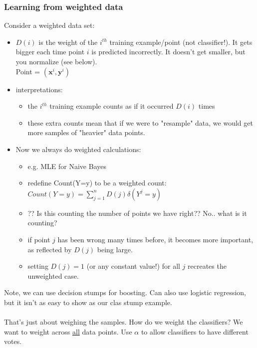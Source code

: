 \subsubsection{Learning from weighted data}  
Consider a weighted data set: \hfill \\
\begin{itemize}
	\item $D(i)$ is the weight of the $i^{th}$ training example/point (not classifier!). 
		It gets bigger each time point $i$ is predicted incorrectly.  
		It doesn't get smaller, but you normalize (see below). 
		\hfill \\
		Point = $(\bm{x}^i, \bm{y}^i)$
	\item interpretations:
		\begin{itemize}
			\item the $i^{th}$ training example counts as if it occurred $D(i)$ times
			\item these extra counts mean that if we were to "resample" data, 
				we would get more samples of "heavier" data points. 
		\end{itemize}
	\item Now we always do weighted calculations:
		\begin{itemize}
			\item e.g. MLE for Naive Bayes
			\item redefine Count(Y=y) to be a weighted count: \hfill \\
				$\displaystyle Count(Y=y) = \sum_{j=1}^n D(j) \delta (Y^j = y)$
			\item ?? Is this counting the number of points we have right?? No.. what is it counting? 
			\item if point $j$ has been wrong many times before, 
					it becomes more important, as reflected by $D(j)$ being large. 
			\item setting $D(j) = 1$ (or any constant value!) for all $j$ recreates the unweighted case. 
		\end{itemize}
\end{itemize}


Note, we can use decision stumps for boosting.  Can also use logistic regression, but it isn't as easy to show as our clas stump example.  \hfill \\
\hfill \\

That's just about weighing the samples.  How do we weight the classifiers? 
We want to weight across \underline{all} data points. 
Use $\alpha$ to allow classifiers to have different votes. 

